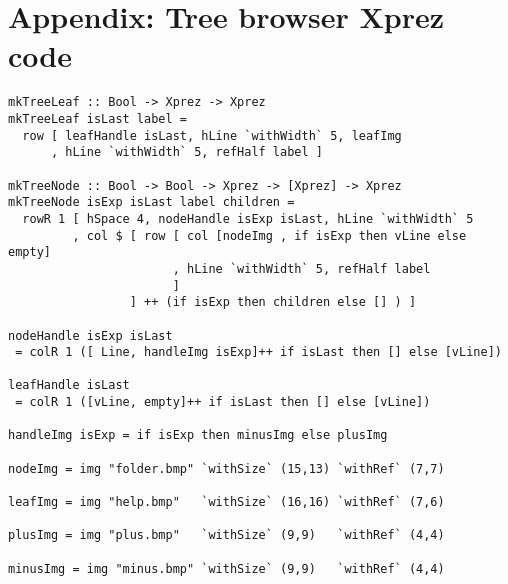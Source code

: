 \section*{Appendix: Tree browser {\sc Xprez} code}
\label{treebrowser}
\begin{small}\begin{verbatim}
mkTreeLeaf :: Bool -> Xprez -> Xprez
mkTreeLeaf isLast label = 
  row [ leafHandle isLast, hLine `withWidth` 5, leafImg
      , hLine `withWidth` 5, refHalf label ] 

mkTreeNode :: Bool -> Bool -> Xprez -> [Xprez] -> Xprez
mkTreeNode isExp isLast label children =
  rowR 1 [ hSpace 4, nodeHandle isExp isLast, hLine `withWidth` 5
         , col $ [ row [ col [nodeImg , if isExp then vLine else empty]
                       , hLine `withWidth` 5, refHalf label 
                       ] 
                 ] ++ (if isExp then children else [] ) ]

nodeHandle isExp isLast 
 = colR 1 ([ Line, handleImg isExp]++ if isLast then [] else [vLine])

leafHandle isLast 
 = colR 1 ([vLine, empty]++ if isLast then [] else [vLine])

handleImg isExp = if isExp then minusImg else plusImg

nodeImg = img "folder.bmp" `withSize` (15,13) `withRef` (7,7)

leafImg = img "help.bmp"   `withSize` (16,16) `withRef` (7,6)

plusImg = img "plus.bmp"   `withSize` (9,9)   `withRef` (4,4)

minusImg = img "minus.bmp" `withSize` (9,9)   `withRef` (4,4)
\end{verbatim}\end{small}